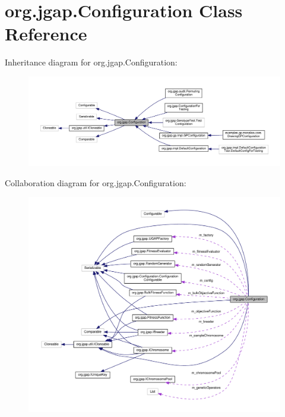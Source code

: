 \hypertarget{classorg_1_1jgap_1_1_configuration}{\section{org.\-jgap.\-Configuration Class Reference}
\label{classorg_1_1jgap_1_1_configuration}
}


Inheritance diagram for org.\-jgap.\-Configuration\-:
\nopagebreak
\begin{figure}[H]
\begin{center}
\leavevmode
\includegraphics[width=350pt]{classorg_1_1jgap_1_1_configuration__inherit__graph}
\end{center}
\end{figure}


Collaboration diagram for org.\-jgap.\-Configuration\-:
\nopagebreak
\begin{figure}[H]
\begin{center}
\leavevmode
\includegraphics[width=350pt]{classorg_1_1jgap_1_1_configuration__coll__graph}
\end{center}
\end{figure}
